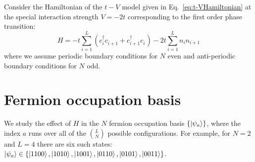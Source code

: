 \label{appendix:flatState}
Consider the Hamiltonian of the $t-V$ model given in Eq.~\ref{eq:t-VHamiltonian} at the special interaction strength $V=-2t$ corresponding to the first order phase transition:
%
\begin{equation}
    H = -t \sum_{i=1}^L (c_{i}^\dagger c_{i+1}^{\phantom{\dagger}} + c_{i+1}^\dagger c_{i}^{\phantom{\dagger}}) -2t \sum_{i=1}^L n_i n_{i+1}
\end{equation}
%
where we assume periodic boundary conditions for $N$ even and anti-periodic
boundary conditions for $N$ odd.  

\section{Fermion occupation basis}

We study the effect of $H$ in the $N$ fermion occupation basis $\{\ket{\psi_a}\}$, where the index $a$ runs over all of the $L\choose N$ possible configurations.  For example, for $N=2$ and $L=4$ there are six such states: $\ket{\psi_a} \in \{\ket{1100}, \ket{1010}, \ket{1001}, \ket{0110}, \ket{0101}, \ket{0011}\}$. 

